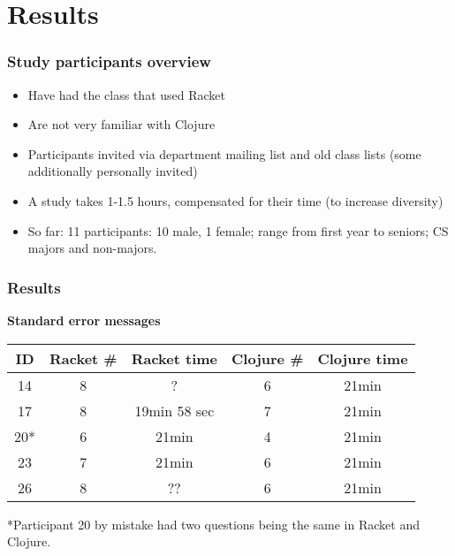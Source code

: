 \documentclass{beamer}
\newcommand{\comment}[1]{{\bf \tt  {#1}}}
\newcommand{\emcomment}[1]{\textcolor{ForestGreen}{\comment{Elena: {#1}}}}
\begin{document}
\section{Results}

\begin{frame}
\frametitle{Study participants overview}
\begin{itemize}
\item Have had the class that used Racket
\item Are not very familiar with Clojure 
\item Participants invited via department mailing list and old class lists (some additionally personally invited)
\item A study takes 1-1.5 hours, compensated for their time (to increase diversity)
\item So far: 11 participants: 10 male, 1 female; range from first year to seniors; CS majors and non-majors.  
\end{itemize}
\end{frame}

\begin{frame}
\frametitle{Results}
{\bf Standard error messages} 
\vspace{0.1in}

\begin{tabular}{c | c| c| c | c }
\hline
{\bf ID} & {\bf Racket  \#} & {\bf Racket time} & {\bf Clojure  \#} & {\bf Clojure time} \\
\hline 
14 &  8 & ? &  6  &  21min \\
17 &  8 & 19min 58 sec &  7 &  21min \\
20* &  6 & 21min &  4 &  21min \\
23 &  7 & 21min &  6  &  21min \\
26 &  8 & ?? &  6 &  21min \\
\hline
\end{tabular}

*Participant 20 by mistake had two questions being the same in Racket and Clojure. 
\end{frame}
\end{document}
